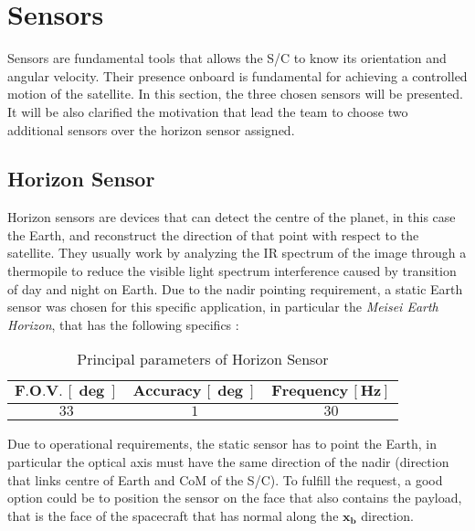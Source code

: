 \section{Sensors}
\label{sec:sensors}

Sensors are fundamental tools that allows the S/C to know its orientation and angular velocity. Their presence onboard is fundamental for achieving a controlled motion of the satellite. In this section, the three chosen sensors will be presented.
It will be also clarified the motivation that lead the team to choose two additional sensors over the horizon sensor assigned. 

\subsection{Horizon Sensor}
\label{subsec:horizon_sensor}

Horizon sensors are devices that can detect the centre of the planet, in this case the Earth, and reconstruct the direction 
of that point with respect to the satellite. They usually work by analyzing the IR spectrum of the image through a thermopile
to reduce the visible light spectrum interference caused by transition of day and night on Earth.
Due to the nadir pointing requirement, a static Earth sensor was chosen for this specific application,
in particular the \textit{Meisei Earth Horizon}, that has the following specifics \cite{horizon_sensor_site}:

\begin{table}[H]

    \centering
    \begin{tabular}{|c|c|c|}
    \hline
    $\bm{F.O.V. \, [\deg]}$ & $\bm{Accuracy \, [\deg]}$ & $\bm{Frequency \, [Hz]}$ \\
    \hline
    $33$ & $1$ & $30$  \\
    \hline
    \end{tabular}
    
    \caption{Principal parameters of Horizon Sensor}
    \label{table:Hor_sensor}
    
\end{table}

Due to operational requirements, the static sensor has to point the Earth, in particular the optical
axis must have the same direction of the nadir (direction that links centre of Earth and CoM of the S/C).
To fulfill the request, a good option could be to position the sensor on the face that also contains the 
payload, that is the face of the spacecraft that has normal along the $\boldsymbol{x_b}$ direction. 

